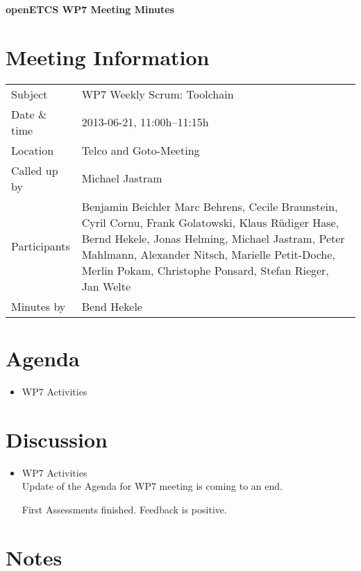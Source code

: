 \documentclass[a4paper, 11pt]{article}
\begin{document}
{\begin{center}\huge\bf openETCS WP7 Meeting Minutes\end{center}}
\section{Meeting Information}

\renewcommand{\arraystretch}{1.5}
\begin{supertabular}{m{.2\textwidth}m{.8\textwidth}}
Subject & WP7 Weekly Scrum: Toolchain\\
Date \& time & 2013-06-21, 11:00h--11:15h\\
Location & Telco and Goto-Meeting\\
Called up by & Michael Jastram\\
Participants &
Benjamin Beichler
Marc Behrens,
Cecile Braunstein,
Cyril Cornu,
Frank Golatowski,
Klaus R\"udiger Hase,
Bernd Hekele,
Jonas Helming,
Michael Jastram,
Peter Mahlmann,
Alexander Nitsch,
Marielle Petit-Doche,
Merlin Pokam,
Christophe Ponsard,
Stefan Rieger,
Jan Welte\\


Minutes by & Bend Hekele\\

\end{supertabular}
\renewcommand{\arraystretch}{1.0}


\section{Agenda}
\begin{itemize}
\item WP7 Activities
\end{itemize}

\section{Discussion}

\begin{itemize}
\item WP7 Activities\\
Update of the Agenda for WP7 meeting is coming to an end. 

First Assessments finished. Feedback is positive.


\end{itemize}

\section{Notes}
\end{document}
